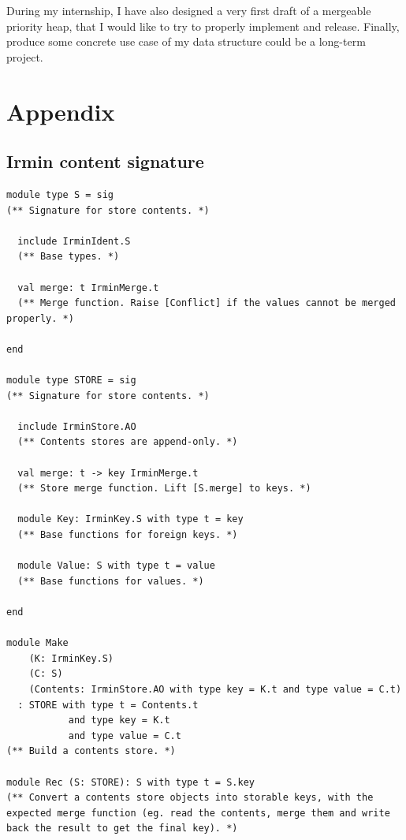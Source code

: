 \documentclass{article}
\newcommand{\irmin}{Irmin\xspace}
\begin{document}
During my internship, I have also designed a very first draft of a mergeable priority heap, that I would like to try to properly implement and release.
Finally, produce some concrete use case of my data structure could be a long-term project.

\FloatBarrier

\nocite{*}



\newpage

\section*{Appendix}
\addtocounter{section}{1}
\setcounter{subsection}{0}
\renewcommand{\thesubsection}{\Alph{subsection}}

\subsection{\irmin content signature\label{appendixcontent}}
\begin{lstlisting}
module type S = sig
(** Signature for store contents. *)

  include IrminIdent.S
  (** Base types. *)

  val merge: t IrminMerge.t
  (** Merge function. Raise [Conflict] if the values cannot be merged properly. *)

end

module type STORE = sig
(** Signature for store contents. *)

  include IrminStore.AO
  (** Contents stores are append-only. *)

  val merge: t -> key IrminMerge.t
  (** Store merge function. Lift [S.merge] to keys. *)

  module Key: IrminKey.S with type t = key
  (** Base functions for foreign keys. *)

  module Value: S with type t = value
  (** Base functions for values. *)

end

module Make
    (K: IrminKey.S)
    (C: S)
    (Contents: IrminStore.AO with type key = K.t and type value = C.t)
  : STORE with type t = Contents.t
           and type key = K.t
           and type value = C.t
(** Build a contents store. *)

module Rec (S: STORE): S with type t = S.key
(** Convert a contents store objects into storable keys, with the expected merge function (eg. read the contents, merge them and write back the result to get the final key). *)
\end{lstlisting}
\end{document}
